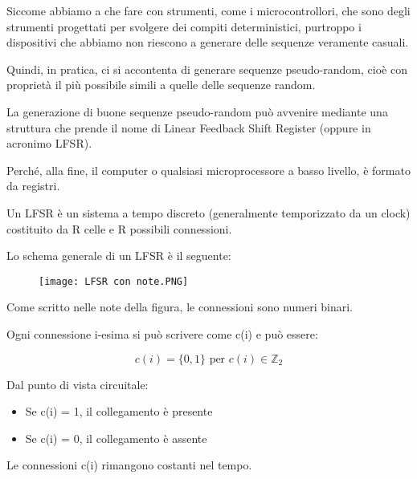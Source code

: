 Siccome abbiamo a che fare con strumenti, come i microcontrollori, 
che sono degli strumenti progettati per svolgere dei compiti deterministici, 
purtroppo i dispositivi che abbiamo non riescono a generare delle sequenze veramente casuali. \newline 

Quindi, in pratica, ci si accontenta di generare sequenze pseudo-random, 
cioè con proprietà il più possibile simili a quelle delle sequenze random. \newline 

La generazione di buone sequenze pseudo-random può avvenire mediante una struttura 
che prende il nome di Linear Feedback Shift Register (oppure in acronimo LFSR). \newline 

\begin{tcolorbox}
    Perché, alla fine, il computer o qualsiasi microprocessore a basso livello, 
    è formato da registri.
\end{tcolorbox}

Un LFSR è un sistema a tempo discreto (generalmente temporizzato da un clock) 
costituito da R celle e R possibili connessioni. \newline 

Lo schema generale di un LFSR è il seguente: 

\begin{figure}[h]
    \centering
    \texttt{[image: LFSR con note.PNG]}
\end{figure}

Come scritto nelle note della figura, 
le connessioni sono numeri binari. \newline 

Ogni connessione i-esima si può scrivere come c(i) e può essere: 

{
    \Large 
    \begin{equation}
        c(i) = \{ 0, 1 \} \text{ per } c(i) \in \mathbb{Z}_2
    \end{equation}
}

Dal punto di vista circuitale: 

\begin{itemize}
    \item Se c(i) = 1, il collegamento è presente 
    \item Se c(i) = 0, il collegamento è assente
\end{itemize}

Le connessioni c(i) rimangono costanti nel tempo. \newline 

